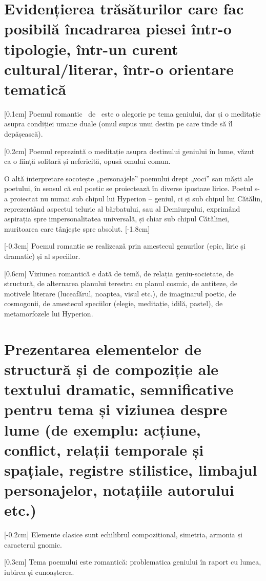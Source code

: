 \section{Evidențierea trăsăturilor care fac posibilă încadrarea piesei într-o tipologie, într-un curent cultural/literar, într-o orientare tematică}

[0.1cm]
Poemul romantic \operatitle\ de \operaauthor\ este o alegorie pe tema geniului, dar și o meditație asupra condiției umane duale (omul supus unui destin pe care tinde să îl depășească).

[0.2cm]
Poemul reprezintă o meditație asupra destinului geniului în lume, văzut ca o ființă solitară și nefericită, opusă omului comun.

O altă interpretare socotește „personajele” poemului drept „voci” sau măști ale poetului, în sensul că eul poetic se proiectează în diverse ipostaze lirice. Poetul s-a proiectat nu numai sub chipul lui Hyperion -- geniul, ci și sub chipul lui Cătălin, reprezentând aspectul teluric al bărbatului, sau al Demiurgului, exprimând aspirația spre impersonalitatea universală, și chiar sub chipul Cătălinei, muritoarea care tânjește spre absolut.
[-1.8cm]

[-0.3cm]
Poemul romantic se realizează prin amestecul genurilor (epic, liric și dramatic) și al speciilor.

[0.6cm]
Viziunea romantică e dată de temă, de relația geniu-societate, de structură, de alternarea planului terestru cu planul cosmic, de antiteze, de motivele literare (luceafărul, noaptea, visul etc.), de imaginarul poetic, de cosmogonii, de amestecul speciilor (elegie, meditație, idilă, pastel), de metamorfozele lui Hyperion.


\section{Prezentarea elementelor de structură și de compoziție ale textului dramatic, semnificative pentru tema și viziunea despre lume {\footnotesize\normalfont(de exemplu: acțiune, conflict, relații temporale și spațiale, registre stilistice, limbajul personajelor, notațiile autorului etc.)}}

[-0.2cm]
Elemente clasice sunt echilibrul compozițional, simetria, armonia și caracterul gnomic.

[0.3cm]
Tema poemului este romantică: problematica geniului în raport cu lumea, iubirea și cunoașterea.

